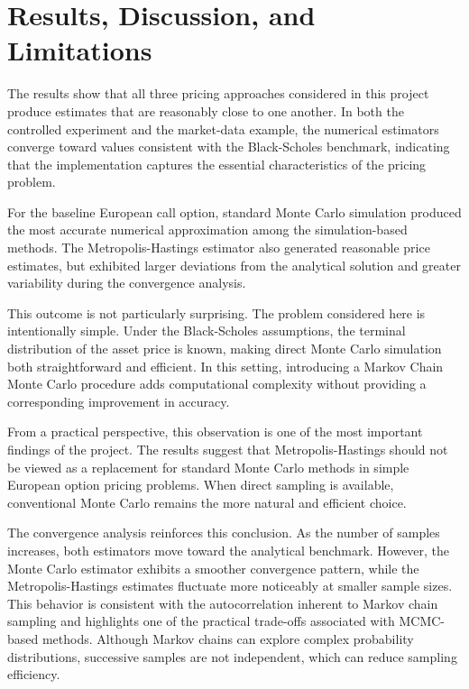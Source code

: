 \documentclass[
  12pt,
  letterpaper,
]{book}
\begin{document}
\section{Results, Discussion, and
Limitations}\label{results-discussion-and-limitations-2}

The results show that all three pricing approaches considered in this
project produce estimates that are reasonably close to one another. In
both the controlled experiment and the market-data example, the
numerical estimators converge toward values consistent with the
Black-Scholes benchmark, indicating that the implementation captures the
essential characteristics of the pricing problem.

For the baseline European call option, standard Monte Carlo simulation
produced the most accurate numerical approximation among the
simulation-based methods. The Metropolis-Hastings estimator also
generated reasonable price estimates, but exhibited larger deviations
from the analytical solution and greater variability during the
convergence analysis.

This outcome is not particularly surprising. The problem considered here
is intentionally simple. Under the Black-Scholes assumptions, the
terminal distribution of the asset price is known, making direct Monte
Carlo simulation both straightforward and efficient. In this setting,
introducing a Markov Chain Monte Carlo procedure adds computational
complexity without providing a corresponding improvement in accuracy.

From a practical perspective, this observation is one of the most
important findings of the project. The results suggest that
Metropolis-Hastings should not be viewed as a replacement for standard
Monte Carlo methods in simple European option pricing problems. When
direct sampling is available, conventional Monte Carlo remains the more
natural and efficient choice.

The convergence analysis reinforces this conclusion. As the number of
samples increases, both estimators move toward the analytical benchmark.
However, the Monte Carlo estimator exhibits a smoother convergence
pattern, while the Metropolis-Hastings estimates fluctuate more
noticeably at smaller sample sizes. This behavior is consistent with the
autocorrelation inherent to Markov chain sampling and highlights one of
the practical trade-offs associated with MCMC-based methods. Although
Markov chains can explore complex probability distributions, successive
samples are not independent, which can reduce sampling efficiency.
\end{document}
